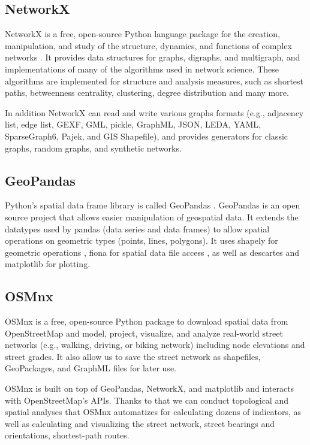 \subsection{NetworkX}

NetworkX is a free, open-source Python language package for the creation, manipulation, and study of the structure, dynamics, and functions of complex networks \cite{hagberg-schult-swart-networkx_2008, networkx_doc}. It provides data structures for graphs, digraphs, and multigraph, and implementations of many of the algorithms used in network science. These algorithms are implemented for structure and analysis measures, such as shortest paths, betweenness centrality, clustering, degree distribution and many more.

In addition NetworkX can read and write various graphs formats (e.g., adjacency list, edge list, GEXF, GML, pickle, GraphML, JSON, LEDA, YAML, SparseGraph6, Pajek, and GIS Shapefile), and provides generators for classic graphs, random graphs, and synthetic networks.


\subsection{GeoPandas}

Python's spatial data frame library is called GeoPandas \cite{geopandas}. GeoPandas is an open source project that allows easier manipulation of geospatial data. It extends the datatypes used by pandas (data series and data frames) \cite{pandas, mckinney-proc-scipy-2010} to allow spatial operations on geometric types (points, lines, polygons). It uses shapely for geometric operations \cite{shapely}, fiona for spatial data file access \cite{fiona}, as well as descartes \cite{descartes} and matplotlib \cite{matplotlib, Hunter:2007} for plotting.

\subsection{OSMnx}

OSMnx \cite{boeing_osmnx_2017} is a free, open-source Python package to download spatial data from OpenStreetMap and model, project, visualize, and analyze real-world street networks (e.g., walking, driving, or biking network) including node elevations and street grades. It also allow us to save the street network as shapefiles, GeoPackages, and GraphML files for later use.

OSMnx is built on top of GeoPandas, NetworkX, and matplotlib and interacts with OpenStreetMap's APIs. Thanks to that we can conduct topological and spatial analyses that OSMnx automatizes for calculating dozens of indicators, as well as calculating and visualizing the street network, street bearings and orientations, shortest-path routes.


